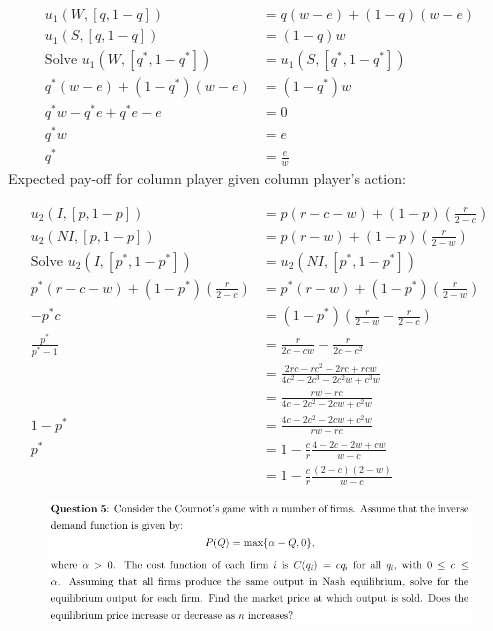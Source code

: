 \documentclass[12pt]{article}
\newenvironment{solution}[2][Solution]{\begin{trivlist}
\item[\hskip \labelsep {\bfseries #1}]}{\end{trivlist}}
\begin{document}
\begin{solution}{}
\begin{enumerate}[label=\alph*)]
\begin{align*}
u_1(W,[q,1-q])&=q(w-e)+(1-q)(w-e)\\
u_1(S,[q,1-q])&=(1-q)w\\
\text{Solve }u_1(W,[q^*,1-q^*])&=u_1(S,[q^*,1-q^*])\\
q^*(w-e)+(1-q^*)(w-e)&=(1-q^*)w\\
q^*w-q^*e+q^*e-e&=0\\
q^*w&=e\\
q^*&=\frac{e}{w}
\end{align*}
Expected pay-off for column player given column player's action:

\begin{align*}
u_2(I,[p,1-p])&=p(r-c-w)+(1-p)(\frac{r}{2-c})\\
u_2(NI,[p,1-p])&=p(r-w)+(1-p)(\frac{r}{2-w})\\
\text{Solve }u_2(I,[p^*,1-p^*])&=u_2(NI,[p^*,1-p^*])\\
p^*(r-c-w)+(1-p^*)(\frac{r}{2-c})&=p^*(r-w)+(1-p^*)(\frac{r}{2-w})\\
-p^*c&=(1-p^*)\left(\frac{r}{2-w}-\frac{r}{2-c}\right)\\
\frac{p^*}{p^*-1}&=\frac{r}{2c-cw}-\frac{r}{2c-c^2}\\
&=\frac{2rc-rc^2-2rc+rcw}{4c^2-2c^3-2c^2w+c^3w}\\
&=\frac{rw-rc}{4c-2c^2-2cw+c^2w}\\
1-p^*&=\frac{4c-2c^2-2cw+c^2w}{rw-rc}\\
p^*&=1-\frac{c}{r}\frac{4-2c-2w+cw}{w-c}\\
&=1-\frac{c}{r}\frac{(2-c)(2-w)}{w-c}
\end{align*}
\end{enumerate}
\end{solution}

\begin{figure}[h!]
\includegraphics[width=\linewidth]{./assets/201805201651.png}
\end{figure}
\end{document}
